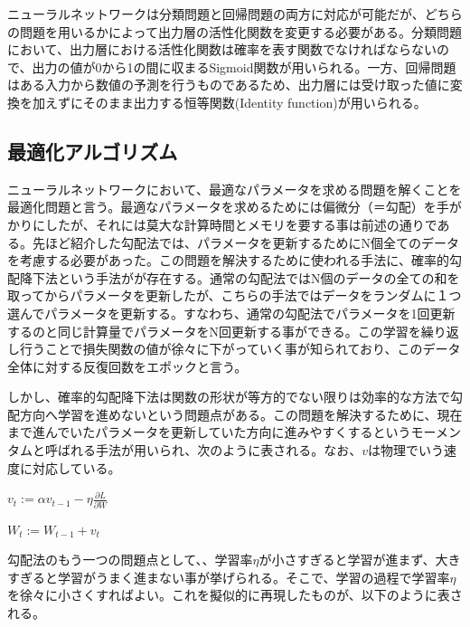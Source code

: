 \documentclass{article}
\begin{document}
ニューラルネットワークは分類問題と回帰問題の両方に対応が可能だが、どちらの問題を用いるかによって出力層の活性化関数を変更する必要がある。分類問題において、出力層における活性化関数は確率を表す関数でなければならないので、出力の値が0から1の間に収まるSigmoid関数が用いられる。一方、回帰問題はある入力から数値の予測を行うものであるため、出力層には受け取った値に変換を加えずにそのまま出力する恒等関数(Identity function)が用いられる。


\subsection{最適化アルゴリズム}

ニューラルネットワークにおいて、最適なパラメータを求める問題を解くことを最適化問題と言う。最適なパラメータを求めるためには偏微分（＝勾配）を手がかりにしたが、それには莫大な計算時間とメモリを要する事は前述の通りである。先ほど紹介した勾配法では、パラメータを更新するためにN個全てのデータを考慮する必要があった。この問題を解決するために使われる手法に、確率的勾配降下法という手法がが存在する。通常の勾配法ではN個のデータの全ての和を取ってからパラメータを更新したが、こちらの手法ではデータをランダムに１つ選んでパラメータを更新する。すなわち、通常の勾配法でパラメータを1回更新するのと同じ計算量でパラメータをN回更新する事ができる。この学習を繰り返し行うことで損失関数の値が徐々に下がっていく事が知られており、このデータ全体に対する反復回数をエポックと言う。

しかし、確率的勾配降下法は関数の形状が等方的でない限りは効率的な方法で勾配方向へ学習を進めないという問題点がある。この問題を解決するために、現在まで進んでいたパラメータを更新していた方向に進みやすくするというモーメンタムと呼ばれる手法が用いられ、次のように表される。なお、\begin{math}v\end{math}は物理でいう速度に対応している。


\begin{center}
\begin{math}
v_t := \alpha v_{t-1} - \eta  \frac{\partial L}{\partial W}
\end{math}
\end{center}

\begin{center}
\begin{math}
W_t := W_{t-1} + v_t
\end{math}
\end{center}


勾配法のもう一つの問題点として、、学習率\begin{math}\eta\end{math}が小さすぎると学習が進まず、大きすぎると学習がうまく進まない事が挙げられる。そこで、学習の過程で学習率\begin{math}\eta\end{math}を徐々に小さくすればよい。これを擬似的に再現したものが、以下のように表される。
\end{document}
